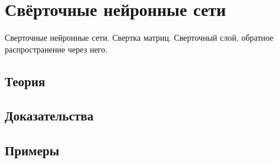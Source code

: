 
\section{Свёрточные нейронные сети}
\label{sec:1.4.13-cnn}

\begin{ticket}
Сверточные нейронные сети. Свертка матриц. Сверточный слой, обратное распространение через него.
\end{ticket}

\subsection*{Теория}

\subsection*{Доказательства}

\subsection*{Примеры}
